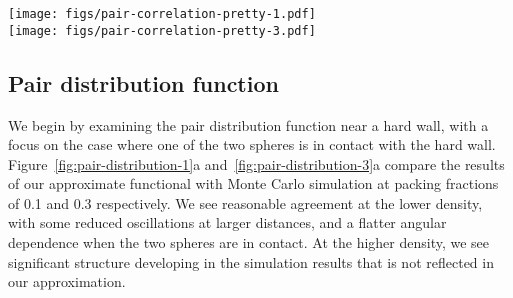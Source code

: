 \documentclass[letterpaper,twocolumn,amsmath,amssymb,pre,aps,10pt]{revtex4-1}
\newcommand{\red}[1]{{\bf \color{red} #1}}
\newcommand{\fixme}[1]{\red{[#1]}}
\begin{document}
\begin{figure*}
  \texttt{[image: figs/pair-correlation-pretty-1.pdf]}\\
  \texttt{[image: figs/pair-correlation-pretty-3.pdf]}
  \caption{  \fixme{Fix *ALL* plots to specify units of distance $x/R$.}
  }\label{fig:pair-distribution-1}
\end{figure*}

\subsection{Pair distribution function}


We begin by examining the pair distribution function near a hard wall,
with a focus on the case where one of the two spheres is in contact
with the hard wall.  Figure~\ref{fig:pair-distribution-1}a
and~\ref{fig:pair-distribution-3}a compare the results of our
approximate functional with Monte Carlo simulation at packing
fractions of 0.1 and 0.3 respectively.  We see reasonable agreement at
the lower density, with some reduced oscillations at larger distances,
and a flatter angular dependence when the two spheres are in contact.
At the higher density, we see significant structure developing in the
simulation results that is not reflected in our approximation.
\end{document}
